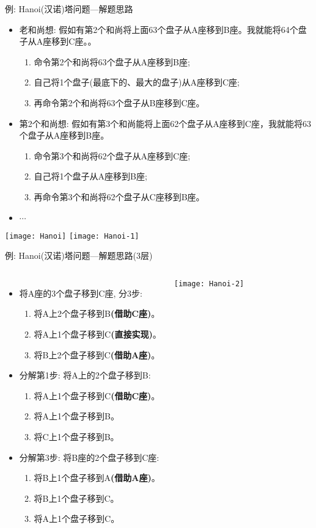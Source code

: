 \begin{frame}[shrink]{例: Hanoi(汉诺)塔问题---解题思路}
\begin{itemize}
	\item 老和尚想: 假如有第2个和尚将上面63个盘子从A座移到B座。我就能将64个盘子从A座移到C座。。
	\begin{enumerate}
		\item 命令第2个和尚将63个盘子从A座移到B座;
		\item 自己将1个盘子(最底下的、最大的盘子)从A座移到C座;
		\item 再命令第2个和尚将63个盘子从B座移到C座。
	\end{enumerate}
    \item 第2个和尚想: 假如有第3个和尚能将上面62个盘子从A座移到C座，我就能将63个盘子从A座移到B座。
    \begin{enumerate}
    	\item 命令第3个和尚将62个盘子从A座移到C座;
    	\item 自己将1个盘子从A座移到B座;
    	\item 再命令第3个和尚将62个盘子从C座移到B座。
    \end{enumerate}
    \item $\cdots$
\end{itemize}
\texttt{[image: Hanoi]}
\texttt{[image: Hanoi-1]}
\end{frame}

\begin{frame}[shrink]{例: Hanoi(汉诺)塔问题---解题思路(3层)}
\begin{columns}[T]
	\begin{itemize}
		\item 将A座的3个盘子移到C座, 分3步:
		\begin{enumerate}
			\item 将A上2个盘子移到B\textbf{(借助C座)}。
			\item 将A上1个盘子移到C\textbf{(直接实现)}。
			\item 将B上2个盘子移到C\textbf{(借助A座)}。
		\end{enumerate}
	    \item 分解第1步: 将A上的2个盘子移到B:
	    \begin{enumerate}
	    	\item 将A上1个盘子移到C\textbf{(借助C座)}。
	    	\item 将A上1个盘子移到B。
	    	\item 将C上1个盘子移到B。
	    \end{enumerate}
        \item 分解第3步: 将B座的2个盘子移到C座:
        \begin{enumerate}
        	\item 将B上1个盘子移到A\textbf{(借助A座)}。
        	\item 将B上1个盘子移到C。
        	\item 将A上1个盘子移到C。
        \end{enumerate}
	\end{itemize}
	\texttt{[image: Hanoi-2]}
\end{columns}
~\\
\end{frame}

